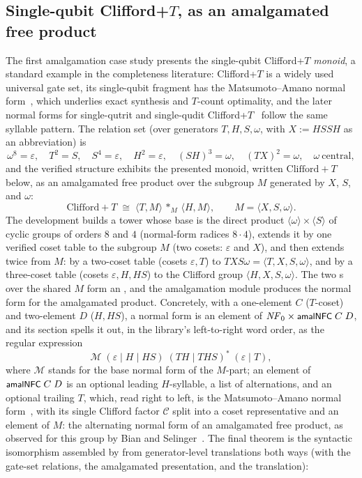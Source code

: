 \subsection{Single-qubit Clifford+$T$, as an amalgamated free product}\label{sec:cliffordt1}

The first amalgamation case study presents the single-qubit Clifford+$T$
\emph{monoid}, a standard example in the completeness literature:
Clifford+$T$ is a widely used universal gate set, its single-qubit
fragment has the Matsumoto--Amano normal
form~\cite{matsumoto2008representation,giles2013remarks}, which underlies
exact synthesis and $T$-count optimality, and the later normal forms
for single-qutrit and single-qudit
Clifford+$T$~\cite{glaudell2019qutrit,prakash2018qutrit,jain2020qudit}
follow the same syllable pattern.  The relation set (over generators
$T, H, S, \omega$, with $X := H S S H$ as an abbreviation) is
\[
  \omega^8 = \varepsilon,\quad
  T^2 = S,\quad
  S^4 = \varepsilon,\quad
  H^2 = \varepsilon,\quad
  (SH)^3 = \omega,\quad
  (TX)^2 = \omega,\quad
  \omega\ \text{central},
\]
and the verified structure exhibits the presented monoid, written
$\mathrm{Clifford}{+}T$ below, as an
amalgamated free product over the subgroup $M$ generated by $X$, $S$, and
$\omega$:
\[
  \mathrm{Clifford}{+}T \;\cong\;
  \langle T, M \rangle \,\ast_{M}\, \langle H, M \rangle,
  \qquad M = \langle X, S, \omega \rangle .
\]
The development builds a tower whose base is the direct product
$\langle \omega \rangle \times \langle S \rangle$ of cyclic groups of
orders $8$ and $4$ (normal-form radices $8 \cdot 4$), extends it by one
verified coset table to the subgroup $M$ (two cosets:
$\varepsilon$ and $X$), and then extends twice from $M$:
by a two-coset table (cosets $\varepsilon, T$) to
$\mathit{TXS\omega} = \langle T, X, S, \omega \rangle$, and by a
three-coset table (cosets $\varepsilon, H, HS$) to the Clifford group
$\langle H, X, S, \omega \rangle$.  The two s over
the shared $M$ form an , and the
amalgamation module produces the normal form for the amalgamated
product.  Concretely, with a one-element $C$ ($T$-coset) and two-element $D$
($H, HS$), a normal form is an element of $\mathit{NF}_0 \times
\mbox{\textsf{\small amalNFC}}\;C\;D$, and its section spells it out, in the library's
left-to-right word order, as the regular expression
\[
  \mathcal{M}\;(\varepsilon \mid H \mid HS)\;(TH \mid THS)^{*}\;(\varepsilon \mid T),
\]
where $\mathcal{M}$ stands for the base normal form of the $M$-part; an
element of $\mbox{\textsf{\small amalNFC}}\;C\;D$ is an optional leading
$H$-syllable, a list of alternations, and an optional trailing $T$,
which, read right to left, is the Matsumoto--Amano normal
form~\cite{matsumoto2008representation,giles2013remarks},
with its single Clifford factor $\mathcal{C}$ split into a coset
representative and an element of $M$:
the alternating normal form of an amalgamated free product, as observed
for this group by Bian and Selinger~\cite{bian2023cliffordcs3}.  The
final theorem is the
syntactic isomorphism assembled by  from
generator-level translations both ways (with \aid{{\_}==={\_}} the
gate-set relations,  the amalgamated presentation, and
 the translation):

